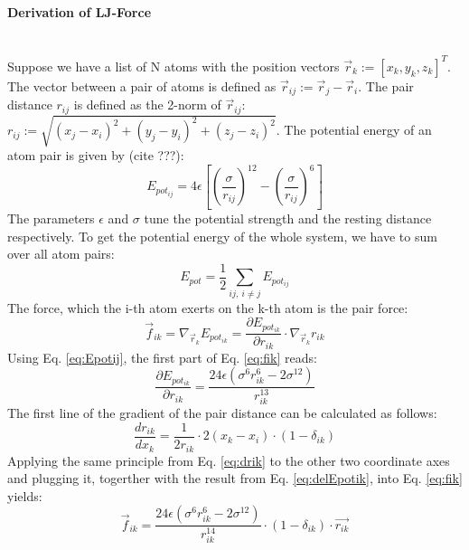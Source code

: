 \documentclass[a4paper,11pt]{report}
\begin{document}
\paragraph{Derivation of LJ-Force}\mbox{}\\
Suppose we have a list of N atoms with the position vectors $\vec{r}_k:=[x_k, y_k, z_k]^T$. The vector between a pair of atoms is defined as $\vec{r}_{ij}:=\vec{r}_j-\vec{r}_i$. The pair distance $r_{ij}$ is defined as the 2-norm of $\vec{r}_{ij}$:\\$r_{ij}:=\sqrt{(x_j-x_i)^2+(y_j-y_i)^2+(z_j-z_i)^2}$. The potential energy of an atom pair is given by (cite ???):
\begin{equation}
	E_{pot_{ij}} = 4\epsilon\left[\left(\dfrac{\sigma}{r_{ij}}\right)^{12}-
	\left(\dfrac{\sigma}{r_{ij}}\right)^{6}\right]\label{eq:Epotij}
\end{equation}
The parameters $\epsilon$ and $\sigma$ tune the potential strength and the resting distance respectively. To get the potential energy of the whole system, we have to sum over all atom pairs:
\begin{equation}
E_{pot}=\dfrac{1}{2}\sum_{ij,~i\neq j}E_{pot_{ij}}
\end{equation}
The force, which the i-th atom exerts on the k-th atom is the pair force:
\begin{equation}
\vec{f}_{ik}=\nabla_{\vec{r}_k} E_{pot_{ik}}=\dfrac{\partial E_{pot_{ik}}}{\partial r_{ik}}\cdot
\nabla_{\vec{r}_k}r_{ik} \label{eq:fik}
\end{equation}
Using Eq. \eqref{eq:Epotij}, the first part of Eq. \eqref{eq:fik} reads:
\begin{equation}
\dfrac{\partial E_{pot_{ik}}}{\partial r_{ik}} = \dfrac{24\epsilon (\sigma^6 r_{ik}^6-2\sigma^{12})}{r_{ik}^{13}}\label{eq:delEpotik}
\end{equation}
The first line of the gradient of the pair distance can be calculated as follows:
\begin{equation}
\dfrac{dr_{ik}}{dx_k}=\dfrac{1}{2r_{ik}}\cdot 2(x_k-x_i)\cdot (1-\delta_{ik}) \label{eq:drik}
\end{equation}
Applying the same principle from Eq. \eqref{eq:drik} to the other two coordinate axes and plugging it, togerther with the result from Eq. \eqref{eq:delEpotik}, into Eq. \eqref{eq:fik} yields:
\begin{equation}
\vec{f}_{ik}=\dfrac{24\epsilon (\sigma^6 r_{ik}^6-2\sigma^{12})}{r_{ik}^{14}}\cdot(1-\delta_{ik})\cdot\vec{r_{ik}}\label{eq:fikf}
\end{equation}
\end{document}
